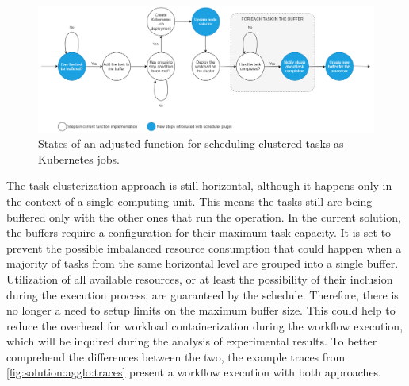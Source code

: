 \begin{figure}[H]
\centering
\includegraphics[width=1\linewidth]{figures/4-2-K8sBufferFunction.png}
\caption[Adjusted Hyperflow function for scheduling clusterized workloads]{States of an adjusted function for scheduling clustered tasks as Kubernetes jobs.}


\label{fig:solution:k8s-states-buffer}
\end{figure}


The task clusterization approach is still horizontal, although it happens only in the context of a single computing unit.
This means the tasks still are being buffered only with the other ones that run the operation.
In the current solution, the buffers require a configuration for their maximum task capacity.
It is set to prevent the possible imbalanced resource consumption that could happen when a majority of tasks from the same horizontal level are grouped into a single buffer.
Utilization of all available resources, or at least the possibility of their inclusion during the execution process, are guaranteed by the schedule.
Therefore, there is no longer a need to setup limits on the maximum buffer size.
This could help to reduce the overhead for workload containerization during the workflow execution, which will be inquired during the analysis of experimental results.
To better comprehend the differences between the two, the example traces from \cref{fig:solution:agglo:traces} present a workflow execution with both approaches.




